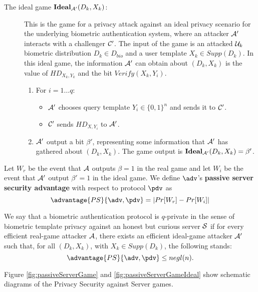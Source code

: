 \begin{description}
\item[The ideal game $\mathbf{Ideal}_{\mathcal{A}'}(D_k,X_k)$:] This is the game for a privacy attack against an ideal
  privacy scenario for the underlying biometric authentication system, where an attacker $\mathcal{A}'$ interacts with a
  challenger $\mathcal{C}'$. The input of the game is an attacked $\mathcal{U}_k$ biometric distribution $D_k \in D_{bio}$ and a
  user template $X_k \in Supp(D_k)$. In this ideal game, the information $\mathcal{A}'$ can obtain about $(D_k,X_k)$ is the
  value of \(HD_{X_{k}, Y_{k}}\) and the bit $Verify(X_k,Y_i)$.
  \begin{enumerate}
  \item For $i = 1 \dots q$:
    \begin{itemize}
    \item $\mathcal{A}'$ chooses query template $Y_i \in \{0,1\}^n$ and sends it to $\mathcal{C}'$.
    \item $\mathcal{C}'$ sends $HD_{X,Y_{i}}$ to $\mathcal{A}'$.
    \end{itemize}
  \item $\mathcal{A}'$ output a bit $\beta'$, representing some information that
    $\mathcal{A}'$ has gathered about $(D_k,X_k)$. The game output is
    $\mathbf{Ideal}_{\mathcal{A}'}(D_k,X_k) = \beta'$.
  \end{enumerate}
\end{description}

Let \(W_{r}\) be the event that \(\mathcal{A}\) outputs $\beta = 1$ in the real game and let
\(W_{i}\) be the event that \(\mathcal{A}'\) output $\beta' = 1$ in the ideal game. We define
$\adv$'s \textbf{passive server security advantage} with respect to protocol $\pdv$ as
\[
\advantage{PS}{\adv,\pdv} = | Pr[W_{r}] - Pr[W_{i}]|
\]

\begin{definition}
   We say that a biometric authentication
  protocol is $q$-private in the sense of biometric template privacy against an
  honest but curious server $\mathcal{S}$ if for every efficient real-game attacker
  $\mathcal{A}$, there exists an efficient ideal-game attacker $\mathcal{A}'$ such
  that, for all $(D_k,X_k)$, with $X_{k} \in Supp(D_{k})$, the following stands:
  \[
    \advantage{PS}{\adv,\pdv} \leq negl(n).
  \]
\end{definition}

Figure \ref{fig:passiveServerGame} and \ref{fig:passiveServerGameIdeal} show
schematic diagrams of the Privacy Security against Server games.

